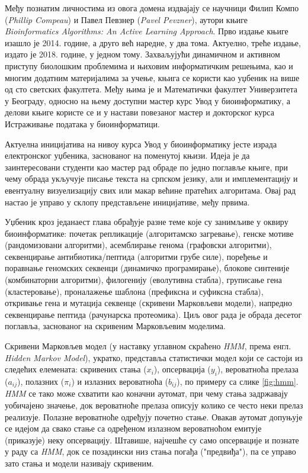 \documentclass[12pt,oneside]{memoir}
\begin{document}
Међу познатим личностима из овога домена издвајају се научници Филип Компо (\textit{Phillip Compeau}) и Павел Певзнер (\textit{Pavel Pevzner}), аутори књиге \textit{Bioinformatics Algorithms: An Active Learning Approach}. Прво издање књиге изашло је 2014. године, а друго већ наредне, у два тома. Актуелно, треће издање, издато је 2018. године, у једном тому. Захваљујући динамичном и активном приступу биолошким проблемима и њиховим информатичким решењима, као и многим додатним материјалима за учење, књига се користи као уџбеник на више од сто светских факултета\cite{ba}. Међу њима је и Математички факултет Универзитета у Београду, односно на њему доступни мастер курс Увод у биоинформатику, а делови књиге користе се и у настави повезаног мастер и докторског курса Истраживање података у биоинформатици\cite{matf}.

Актуелна иницијатива на нивоу курса Увод у биоинформатику јесте израда електронског уџбеника, заснованог на поменутој књизи. Идеја је да заинтересовани студенти као мастер рад обраде по једно поглавље књиге, при чему обрада укључује писање текста на српском језику, али и имплементацију и евентуалну визуелизацију свих или макар већине пратећих алгоритама. Овај рад настао је управо у склопу представљене иницијативе, међу првима.

Уџбеник кроз једанаест глава обрађује разне теме које су занимљиве у оквиру биоинформатике: почетак репликације (алгоритамско загревање), генске мотиве (рандомизовани алгоритми), асемблирање генома (графовски алгоритми), секвенцирање антибиотика/пептида (алгоритми грубе силе), поређење и поравнање геномских секвенци (динамичко програмирање), блокове синтеније (комбинаторни алгоритми), филогенију (еволутивна стабла), груписање гена (кластеровање), проналажење шаблона (префиксна и суфиксна стабла), откривање гена и мутација секвенце (скривени Марковљеви модели), напредно секвенцирање пептида (рачунарска протеомика). Циљ овог рада је обрада десетог поглавља, заснованог на скривеним Марковљевим моделима\cite{compeau2015}.

Скривени Марковљев модел (у наставку углавном скраћено \textit{HMM}, према енгл. \textit{Hidden Markov Model}), укратко, представља статистички модел који се састоји из следећих елемената: скривених стања ($x_i$), опсервација ($y_i$), вероватноћа прелаза ($a_{ij}$), полазних ($\pi_i$) и излазних вероватноћа ($b_{ij}$), по примеру са слике \ref{fig:hmm}. \textit{HMM} се тако може схватити као коначни аутомат, при чему стања задржавају уобичајено значење, док вероватноће прелаза описују колико се често неки прелаз реализује. Полазне вероватноће одређују почетно стање. Овакав аутомат допуњује се идејом да свако стање са одређеном излазном вероватноћом емитује (приказује) неку опсервацију. Штавише, најчешће су само опсервације и познате у раду са \textit{HMM}, док се позадински низ стања погађа ("предвиђа"), па се управо зато стања и модели називају скривеним\cite{stamp2021}.
\end{document}

